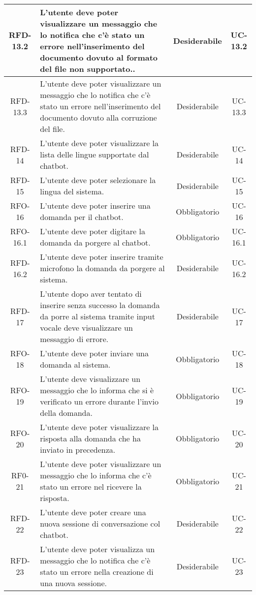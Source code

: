 \begin{xltabular}{\textwidth}{| c | X | c | c |}
    \hline
    RFD-13.2 & L'utente deve poter visualizzare un messaggio che lo notifica che c'è stato un errore nell'inserimento del documento dovuto al formato del file non supportato.. & Desiderabile & UC-13.2 \\
    \hline
    RFD-13.3 & L'utente deve poter visualizzare un messaggio che lo notifica che c'è stato un errore nell'inserimento del documento dovuto alla corruzione del file. & Desiderabile & UC-13.3 \\
    \hline
    RFD-14 & L’utente deve poter visualizzare la lista delle lingue supportate dal chatbot. & Desiderabile & UC-14 \\
    \hline
    RFD-15 & L’utente deve poter selezionare la lingua del sistema. & Desiderabile & UC-15 \\
    \hline
    RFO-16 & L’utente deve poter inserire una domanda per il chatbot. & Obbligatorio & UC-16 \\
    \hline
    RFO-16.1 & L’utente deve poter digitare la domanda da porgere al chatbot. & Obbligatorio & UC-16.1 \\
    \hline
    RFD-16.2 & L’utente deve poter inserire tramite microfono la domanda da porgere al sistema. & Desiderabile & UC-16.2 \\
    \hline
    RFD-17 & L’utente dopo aver tentato di inserire senza successo la domanda da porre al sistema tramite input vocale deve visualizzare un messaggio di errore. & Desiderabile & UC-17 \\
    \hline
    RFO-18 & L’utente deve poter inviare una domanda al sistema. & Obbligatorio & UC-18 \\
    \hline
    RFO-19 & L’utente deve visualizzare un messaggio che lo informa che si è verificato un errore durante l'invio della domanda. & Obbligatorio & UC-19 \\
    \hline
    RFO-20 & L’utente deve poter visualizzare la risposta alla domanda che ha inviato in precedenza. & Obbligatorio & UC-20 \\
    \hline
    RF0-21 & L'utente deve poter visualizzare un messaggio che lo informa che c'è stato un errore nel ricevere la risposta. & Obbligatorio & UC-21 \\
    \hline
    RFD-22 & L’utente deve poter creare una nuova sessione di conversazione col chatbot. & Desiderabile & UC-22 \\
    \hline
    RFD-23 & L'utente deve poter visualizza un messaggio che lo notifica che c'è stato un errore nella creazione di una nuova sessione. & Desiderabile & UC-23 \\

\end{xltabular}
